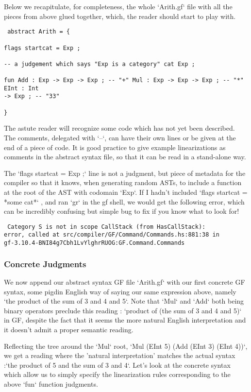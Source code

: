 \documentclass[11pt, a4paper]{article}
\begin{document}
Below we recapitulate, for completeness, the whole `Arith.gf` file with all the
pieces from above glued together, which, the reader should start to play with.

\begin{verbatim} abstract Arith = {

flags startcat = Exp ;

-- a judgement which says "Exp is a category" cat Exp ;

fun Add : Exp -> Exp -> Exp ; -- "+" Mul : Exp -> Exp -> Exp ; -- "*" EInt : Int
-> Exp ; -- "33"

}
\end{verbatim}

The astute reader will recognize some code which has not yet been described. The
comments, delegated with `--`, can have their own lines or be given at the end
of a piece of code. It is good practice to give example linearizations as
comments in the abstract syntax file, so that it can be read in a stand-alone
way.

The `flags startcat = Exp ;` line is not a judgment, but piece of metadata for
the compiler so that it knows, when generating random ASTs, to include a
function at the root of the AST with codomain `Exp`. If I hadn't included `flags
startcat = *some cat*` , and ran `gr` in the gf shell, we would get the
following error, which can be incredibly confusing but simple bug to fix if you
know what to look for!

\begin{verbatim} Category S is not in scope CallStack (from HasCallStack):
error, called at src/compiler/GF/Command/Commands.hs:881:38 in
gf-3.10.4-BNI84g7Cbh1LvYlghrRUOG:GF.Command.Commands
\end{verbatim}


\subsubsection{Concrete Judgments}

We now append our abstract syntax GF file `Arith.gf` with our first concrete GF
syntax, some pigdin English way of saying our same expression above, namely `the
product of the sum of 3 and 4 and 5`. Note that `Mul` and `Add` both being
binary operators preclude this reading : `product of (the sum of 3 and 4 and 5)`
in GF, despite the fact that it seems the more natural English interpretation
and it doesn't admit a proper semantic reading.

Reflecting the tree around the `Mul` root, `Mul (EInt 5) (Add (EInt 3) (EInt
4))`, we get a reading where the 'natural interpretation' matches the actual
syntax :`the product of 5 and the sum of 3 and 4`. Let's look at the concrete
syntax which allow us to simply specify the linearization rules corresponding to
the above `fun` function judgments.
\end{document}
